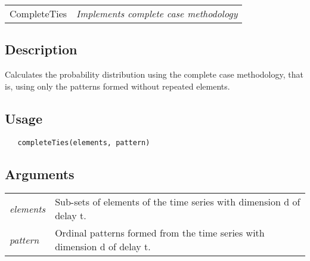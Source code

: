 \documentclass[12pt,letterpaper]{article}
\begin{document}
\hrulefill   

\begin{table}[!ht]
\begin{center}
\begin{tabularx}{\textwidth}{ X X}
\hspace{0.5cm} CompleteTies & \textit{Implements complete case methodology }\\
\end{tabularx}
\end{center}
\end{table} 

\vspace{-0.5cm}

\hrulefill  

\vspace{0.5cm}

\subsection*{Description}

Calculates the probability distribution using the complete case methodology, that is, using only the patterns formed without repeated elements.

\vspace{0.5cm}

\subsection*{Usage}

\begin{lstlisting}
   completeTies(elements, pattern)
\end{lstlisting}

\vspace{0.5cm}

\newpage

\subsection*{Arguments}

\begin{table}[!ht]
\begin{center}
\begin{tabularx}{\textwidth}{X X}
\hspace{0.5cm} \textit{elements} & Sub-sets of elements of the time series with dimension d of delay t.\\
\hspace{0.5cm} \textit{pattern} & Ordinal patterns formed from the time series with dimension d of delay t.\\
\end{tabularx}
\end{center}
\end{table} 
\end{document}
